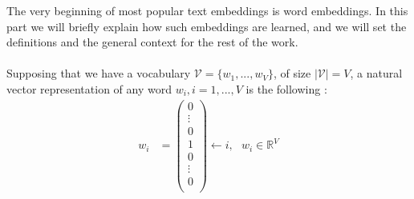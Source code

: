 \documentclass{article}
\newcommand{\R}{\mathbb R}
\begin{document}
The very beginning of most popular
text embeddings is word embeddings. In this part
we will briefly explain how such embeddings are learned, and we will
set the definitions and the general context for the rest of the 
work. \\ \\
Supposing that we have a vocabulary 
$\mathcal{V} = \{w_1, ..., w_V \}$, of size 
$| \mathcal{V} | = V$, a natural vector representation of any word 
$w_i, i=1, ..., V$ is the following :
\begin{align*}
    w_i &= 
    \left (
    \begin{array}{c}
        0 \\
        \vdots \\
        0 \\
        1 \\
        0 \\
        \vdots \\
        0 \\
    \end{array}
    \right ) \leftarrow i,\ \ \ w_i \in \R^V
\end{align*}
\end{document}
